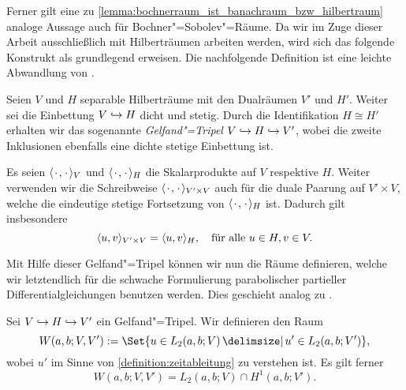 \documentclass[../main.tex]{subfiles}
\begin{document}
Ferner gilt eine zu \cref{lemma:bochnerraum_ist_banachraum_bzw_hilbertraum} analoge Aussage auch für Bochner"=Sobolev"=Räume.
Da wir im Zuge dieser Arbeit ausschließlich mit Hilberträumen arbeiten werden, wird sich das folgende Konstrukt als grundlegend erweisen.
Die nachfolgende Definition ist eine leichte Abwandlung von \cite[Abschnitt 10.2]{Schweizer2013}.

\begin{Definition}
\label{definition:gelfand_tripel}
    Seien $V$ und $H$ separable Hilberträume mit den Dualräumen $V'$ und $H'$.
    Weiter sei die Einbettung $V \denseinclusion H$ dicht und stetig.
    Durch die Identifikation $H \cong H'$ erhalten wir das sogenannte \emph{Gelfand"=Tripel} $V \denseinclusion H \denseinclusion V'$, wobei die zweite Inklusionen ebenfalls eine dichte stetige Einbettung ist.
\end{Definition}

\begin{Bemerkung}
\label{bemerkung:skalarprodukte_und_duality_pairing}
    Es seien $\skp{\blank}{\blank}{V}$ und $\skp{\blank}{\blank}{H}$ die Skalarprodukte auf $V$ respektive $H$.
    Weiter verwenden wir die Schreibweise $\skp{\blank}{\blank}{V' \times V}$ auch für die duale Paarung auf $V' \times V$, welche die eindeutige stetige Fortsetzung von $\skp{\blank}{\blank}{H}$ ist.
    Dadurch gilt insbesondere
    \begin{equation}
        \skp{u}{v}{V' \times V} = \skp{u}{v}{H}, \quad \fa u \in H, v \in V.
    \end{equation}
\end{Bemerkung}

Mit Hilfe dieser Gelfand"=Tripel können wir nun die Räume definieren, welche wir letztendlich für die schwache Formulierung parabolischer partieller Differentialgleichungen benutzen werden.
Dies geschieht analog zu \cite[Definition XVIII.2.4]{Dautray:1992by}.

\begin{Definition}
\label{definition:bochner_raum_W}
    Sei $V \denseinclusion H \denseinclusion V'$ ein Gelfand"=Tripel.
    Wir definieren den Raum
    \begin{equation}
        W(a, b; V, V') := \Set{u \in L_{2}(a, b; V) \given u' \in L_{2}(a, b; V')},
    \end{equation}
    wobei $u'$ im Sinne von \cref{definition:zeitableitung} zu verstehen ist.
    Es gilt ferner
    \begin{equation}
        W(a, b; V, V') = L_{2}(a, b; V) \cap H^{1}(a, b; V').
    \end{equation}
\end{Definition}
\end{document}
